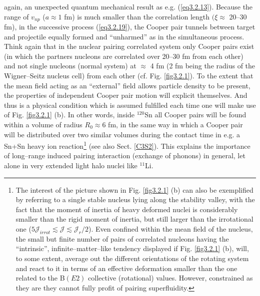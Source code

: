 again, an unexpected quantum mechanical result as e.g. (\ref{eq3.2.13}). Because the range of $v_{np}$ ($a\approx 1$ fm) is much smaller than the correlation length $(\xi\approx$ 20--30 fm), in the successive process (\ref{eq3.2.19}), the Cooper pair tunnels between target and projectile equally formed and ``unharmed'' as in the simultaneous process. Think again that in the nuclear pairing correlated system only Cooper pairs exist  (in which the partners nucleons are correlated over 20--30 fm from each other) and not single nucleons (normal system)  at $\approx$ 4 fm (2 fm being the radius of the Wigner--Seitz nucleus cell) from each other (cf. Fig. \ref{fig3.2.1}). To the extent that the mean field acting as an ``external'' field allows particle density to be present, the properties of independent Cooper pair motion will explicit themselves. And thus is a physical condition which is assumed fulfilled each time one will make use of Fig. \ref{fig3.2.1} (b). In other words, inside $^{120}$Sn all Cooper pairs will be found within a volume of radius $R_0\approx 6$ fm, in the same way in which a Cooper pair will be distributed over two similar volumes during the contact time  in e.g. a Sn+Sn heavy ion reaction\footnote{The interest of the  picture shown in Fig. \ref{fig3.2.1} (b) can also be exemplified by referring to a single stable nucleus lying along the stability valley, with the fact that the moment of inertia of heavy deformed nuclei is considerably smaller than the rigid moment of inertia, but still larger than the irrotational one ($5\mathcal J_{irrot}\lesssim\mathcal J\lesssim  \mathcal J_r/2$). Even confined within the mean field of the nucleus, the small but finite number of pairs of correlated nucleons having the ``intrinsic'', infinite--matter--like tendency displayed if Fig. \ref{fig3.2.1} (b), will, to some extent, average out the different orientations of the rotating system and react to it in terms of an effective deformation smaller than the one related to the B$(E2)$ collective (rotational) values. However, constrained as they are they cannot fully profit of pairing superfluidity.} (see also Sect. \ref{C3S2}).  This explains the importance of long--range induced pairing interaction (exchange of phonons) in general, let alone in very extended light halo nuclei like $^{11}$Li.

